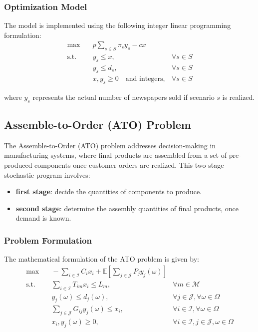 \documentclass[a4paper,12pt]{article}
\begin{document}
	\subsubsection{Optimization Model}
	
	The model is implemented using the following integer linear programming formulation:
	\[
	\begin{aligned}
		\max & \quad p \sum_{s \in S} \pi_s y_s - c x \\
		\text{s.t.} & \quad y_s \leq x, & \forall s \in S \\
		& \quad y_s \leq d_s, & \forall s \in S \\
		& \quad x, y_s \geq 0 \quad \text{and integers}, & \forall s \in S
	\end{aligned}
	\]
	
\noindent	where \( y_s \) represents the actual number of newspapers sold if scenario \( s \) is realized.
	
	\subsection{Assemble-to-Order (ATO) Problem}
	
	The Assemble-to-Order (ATO) problem addresses decision-making in manufacturing systems, where final products are assembled from a set of pre-produced components once customer orders are realized. This two-stage stochastic program involves:
	\begin{itemize}
		\item \textbf{first stage}: decide the quantities of components to produce.
		\item \textbf{second stage}: determine the assembly quantities of final products, once demand is known.
	\end{itemize}
	
	\subsubsection{Problem Formulation}
	
	The mathematical formulation of the ATO problem is given by:
	\[
	\begin{aligned}
		\max & \quad -\sum_{i \in \mathcal{I}} C_i x_i + \mathbb{E}\left[\sum_{j \in \mathcal{J}} P_j y_j(\omega)\right] \\
		\text{s.t.} & \quad \sum_{i \in \mathcal{I}} T_{im} x_i \leq L_m, & \forall m \in \mathcal{M} \\
		& \quad y_j(\omega) \leq d_j(\omega), & \forall j \in \mathcal{J}, \forall \omega \in \Omega \\
		& \quad \sum_{j \in \mathcal{J}} G_{ij} y_j(\omega) \leq x_i, & \forall i \in \mathcal{I}, \forall \omega \in \Omega \\
		& \quad x_i, y_j(\omega) \geq 0, & \forall i \in \mathcal{I}, j \in \mathcal{J}, \omega \in \Omega
	\end{aligned}
	\]
	
\end{document}
